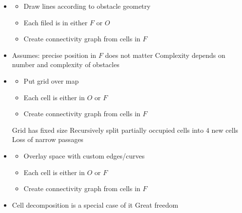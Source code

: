 \begin{itemize}
\begin{itemize}
\begin{itemize}
                    \item
                        \begin{itemize}
                            \item Draw lines according to obstacle geometry
                            \item Each filed is in either $F$ or $O$
                            \item Create connectivity graph from cells in $F$
                        \end{itemize}
                    \item Assumes: precise position in $F$ does not matter
                        \icon Complexity depends on number and complexity of obstacles
                \end{itemize}
                \begin{itemize}
                    \item
                        \begin{itemize}
                            \item Put grid over map
                            \item Each cell is either in $O$ or $F$
                            \item Create connectivity graph from cells in $F$
                        \end{itemize}
                         Grid has fixed size
                         Recursively split partially occupied cells into $4$ new cells
                        \icon Loss of narrow passages
                \end{itemize}
                \begin{itemize}
                    \item
                        \begin{itemize}
                            \item Overlay space with custom edges/curves
                            \item Each cell is either in $O$ or $F$
                            \item Create connectivity graph from cells in $F$
                        \end{itemize}
                    \item Cell decomposition is a special case of it
                    \ipro Great freedom

\end{itemize}
\end{itemize}
\end{itemize}
